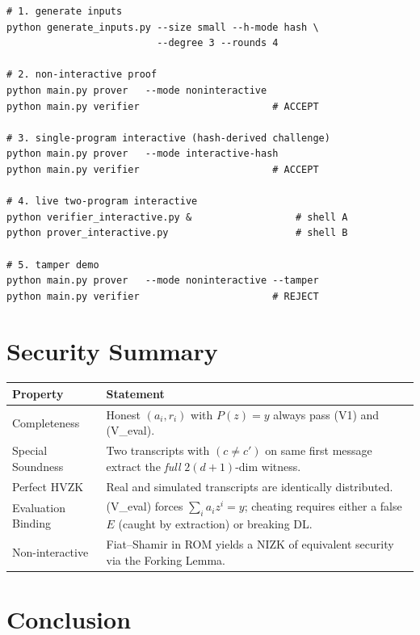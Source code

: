 \documentclass[11pt,a4paper]{article}
\begin{document}
\begin{lstlisting}[style=bashstyle]
# 1. generate inputs
python generate_inputs.py --size small --h-mode hash \
                          --degree 3 --rounds 4

# 2. non-interactive proof
python main.py prover   --mode noninteractive
python main.py verifier                       # ACCEPT

# 3. single-program interactive (hash-derived challenge)
python main.py prover   --mode interactive-hash
python main.py verifier                       # ACCEPT

# 4. live two-program interactive
python verifier_interactive.py &                  # shell A
python prover_interactive.py                      # shell B

# 5. tamper demo
python main.py prover   --mode noninteractive --tamper
python main.py verifier                       # REJECT
\end{lstlisting}

\section{Security Summary}

\begin{center}
\begin{tabular}{p{} p{}}
\toprule
\textbf{Property} & \textbf{Statement}\\
\midrule
Completeness      & Honest $(a_i,r_i)$ with $P(z)=y$ always pass (V1) and (V\_eval).\\
Special Soundness & Two transcripts with $(c\ne c')$ on same first message extract the \emph{full} $2(d+1)$-dim witness.\\
Perfect HVZK      & Real and simulated transcripts are identically distributed.\\
Evaluation Binding& (V\_eval) forces $\sum_i a_i z^{i}=y$; cheating requires either a false $E$ (caught by extraction) or breaking DL.\\
Non-interactive   & Fiat--Shamir in ROM yields a NIZK of equivalent security via the Forking Lemma.\\
\bottomrule
\end{tabular}
\end{center}

\section{Conclusion}
\end{document}
